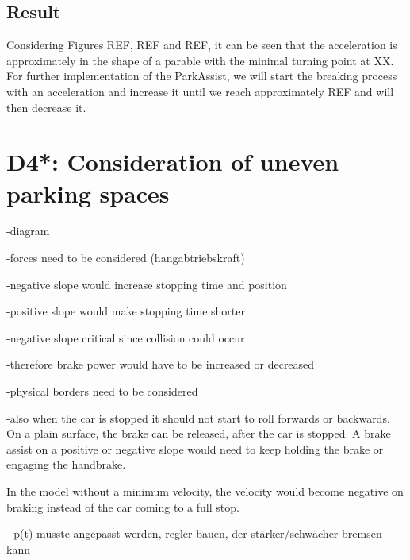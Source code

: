 \section{Result}
Considering Figures REF, REF and REF, it can be seen that the acceleration is approximately in the shape of a parable with the minimal turning point at XX. For further implementation of the ParkAssist, we will start the breaking process with an acceleration and increase it until we reach approximately REF and will then decrease it.

%
%
%

\chapter{D4*: Consideration of uneven parking spaces}\label{cha:D4}
-diagram

-forces need to be considered (hangabtriebskraft)

-negative slope would increase stopping time and position

-positive slope would make stopping time shorter

-negative slope critical since collision could occur

-therefore brake power would have to be increased or decreased

-physical borders need to be considered

-also when the car is stopped it should not start to roll forwards or backwards.
On a plain surface, the brake can be released, after the car is stopped.
A brake assist on a positive or negative slope would need to keep holding the brake or engaging the handbrake.

In the model without a minimum velocity, the velocity would become negative on braking instead of the car coming to a full stop.

- p(t) müsste angepasst werden, regler bauen, der stärker/schwächer bremsen kann 


